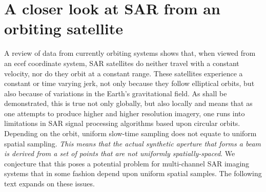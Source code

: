 \section{A closer look at SAR from an orbiting satellite}
A review of data from currently orbiting systems shows that, when viewed from an \gls{ecef} coordinate system,  SAR satellites do neither travel with a constant velocity, nor do they orbit at a constant range. These satellites experience a constant or time varying jerk, not only because they follow elliptical orbits, but also because of variations in the Earth's gravitational field. As shall be demonstrated, this is true not only globally, but also locally and means that as one attempts to produce higher and higher resolution imagery, one runs into limitations in SAR signal processing algorithms based upon circular orbits. Depending on the orbit, uniform slow-time sampling does not equate to uniform spatial sampling. {\em This means that the actual synthetic aperture that forms a beam is derived from a set of points that are not uniformly spatially-spaced}. We conjecture that this poses a potential problem for multi-channel SAR imaging systems that in some fashion depend upon uniform spatial samples. The following text expands on these issues.
